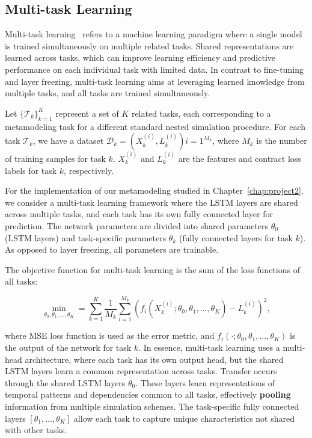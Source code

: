 \subsection{Multi-task Learning}

Multi-task learning~\citep{caruana1997multitask} refers to a machine learning paradigm where a single model is trained simultaneously on multiple related tasks.
Shared representations are learned across tasks, which can improve learning efficiency and predictive performance on each individual task with limited data.
In contrast to fine-tuning and layer freezing, multi-task learning aims at leveraging learned knowledge from multiple tasks, and all tasks are trained simultaneously.


Let $\{\mathcal{T}_k\}_{k=1}^K$ represent a set of $K$ related tasks, each corresponding to a metamodeling task for a different standard nested simulation procedure.
For each task $\mathcal{T}_k$, we have a dataset $\mathcal{D}_k = { (X_k^{(i)}, L_k^{(i)}) }{i=1}^{M_k}$, where $M_k$ is the number of training samples for task $k$.
$X_k^{(i)}$ and $L_k^{(i)}$ are the features and contract loss labels for task $k$, respectively.

For the implementation of our metamodeling studied in Chapter~\ref{chap:project2}, we consider a multi-task learning framework where the LSTM layers are shared across multiple tasks, and each task has its own fully connected layer for prediction.
The network parameters are divided into shared parameters $\theta_0$ (LSTM layers) and task-specific parameters $\theta_k$ (fully connected layers for task $k$). 
As opposed to layer freezing, all parameters are trainable.

The objective function for multi-task learning is the sum of the loss functions of all tasks:

\begin{equation} 
    \min_{\theta_0, \theta_1, \dots, \theta_K} = \sum_{k=1}^K \frac{1}{M_k} \sum_{i=1}^{M_k} \left( f_i(X_k^{(i)}; \theta_0, \theta_1, \dots, \theta_K) - L_k^{(i)} \right)^2,
\end{equation}

where MSE loss function is used as the error metric, and $f_i(\cdot; \theta_0, \theta_1, \dots, \theta_K)$ is the output of the network for task $k$.
In essence, multi-task learning uses a multi-head architecture, where each task has its own output head, but the shared LSTM layers learn a common representation across tasks.
Transfer occurs through the shared LSTM layers $\theta_0$. 
These layers learn representations of temporal patterns and dependencies common to all tasks, effectively \textbf{pooling} information from multiple simulation schemes. 
The task-specific fully connected layers $[\theta_1, \dots, \theta_K]$ allow each task to capture unique characteristics not shared with other tasks.



